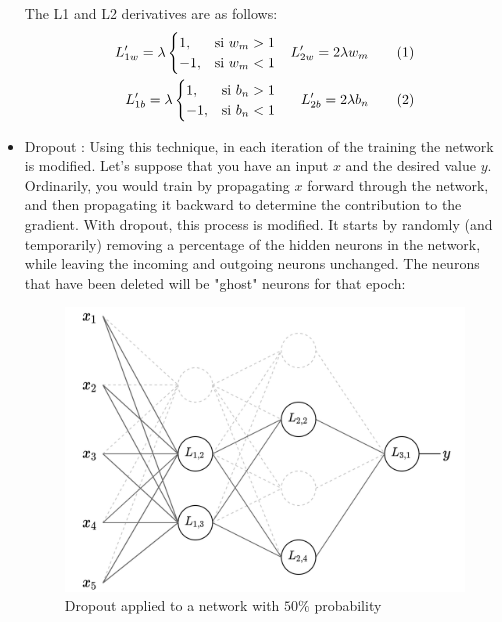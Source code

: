 \begin{itemize}
The L1 and L2 derivatives are as follows:
\begin{align*}
     L'_{1w} = \lambda \begin{cases} 1,& \text{si } w_m > 1\\ -1,& \text{si } w_m < 1\end{cases} && L'_{2w} =  2\lambda w_m \addtocounter{equation}{1}\tag{\theequation} \\ 
     L'_{1b} =  \lambda \begin{cases} 1,& \text{si } b_n > 1\\ -1,& \text{si } b_n < 1\end{cases} && L'_{2b} = 2\lambda b_n \addtocounter{equation}{1}\tag{\theequation}
\end{align*}
    
    \item Dropout \label{dropout}: Using this technique, in each iteration of the training the network is modified. Let's suppose that you have an input $x$ and the desired value $y$. Ordinarily, you would train by propagating $x$ forward through the network, and then propagating it backward to determine the contribution to the gradient. With dropout, this process is modified. It starts by randomly (and temporarily) removing a percentage of the hidden neurons in the network, while leaving the incoming and outgoing neurons unchanged. The neurons that have been deleted will be "ghost" neurons for that epoch:
    
    \begin{figure}[H]
        \centering
        \includegraphics[width=12cm]{images/state-of-art/overfitting/dropout-1.png}
        \caption{Dropout applied to a network with $50\%$ probability}
        \label{fig:basic_network}
    \end{figure}
    

\end{itemize}
